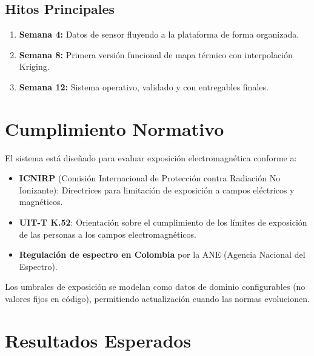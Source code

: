 \documentclass[12pt,a4paper]{article}
\begin{document}
\subsection{Hitos Principales}

\begin{enumerate}[leftmargin=*]
  \item \textbf{Semana 4:} Datos de sensor fluyendo a la plataforma de forma organizada.
  \item \textbf{Semana 8:} Primera versión funcional de mapa térmico con interpolación Kriging.
  \item \textbf{Semana 12:} Sistema operativo, validado y con entregables finales.
\end{enumerate}

\section{Cumplimiento Normativo}

El sistema está diseñado para evaluar exposición electromagnética conforme a:

\begin{itemize}
  \item \textbf{ICNIRP} (Comisión Internacional de Protección contra Radiación No Ionizante): Directrices para limitación de exposición a campos eléctricos y magnéticos.
  \item \textbf{UIT-T K.52}: Orientación sobre el cumplimiento de los límites de exposición de las personas a los campos electromagnéticos.
  \item \textbf{Regulación de espectro en Colombia} por la ANE (Agencia Nacional del Espectro).
\end{itemize}

Los umbrales de exposición se modelan como datos de dominio configurables (no valores fijos en código), permitiendo actualización cuando las normas evolucionen.

\section{Resultados Esperados}
\end{document}
